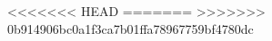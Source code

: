 %
\cleardoublepage
\pagestyle{style6}
<<<<<<< HEAD
\setcounter{tocdepth}{1}
=======
>>>>>>> 0b914906bc0a1f3ca7b01ffa78967759bf4780dc
\tableofcontents
\pagestyle{style6}
\cleardoublepage
\BeginNoToc
\pagestyle{style5}
\listoffigures
\thispagestyle{style5}
\cleardoublepage
\thispagestyle{style4}
\thispagestyle{style4}
%
\cleardoublepage
{}
\mainmatter
{}%
\EndNoToc